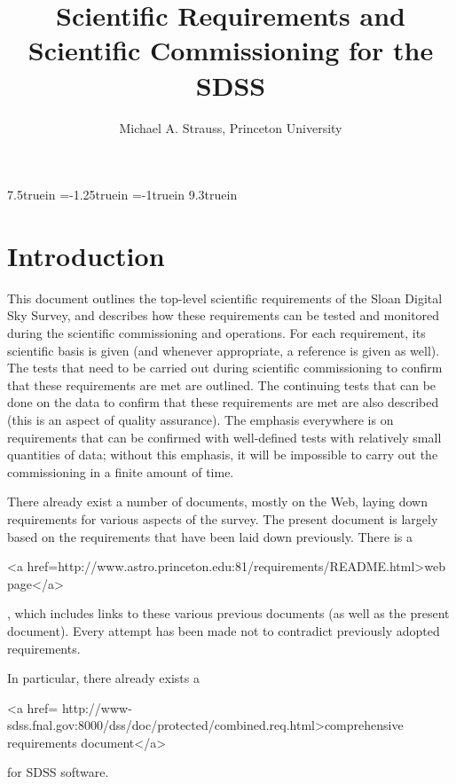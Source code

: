 \textwidth 7.5truein
\hoffset=-1.25truein
\voffset=-1truein
\textheight 9.3truein
\newcommand{\htmladdnormallink}[2]{
\begin{rawhtml}
<a href=#2>#1</a>
\end{rawhtml}
}
\setcounter{tocdepth}{1}

\title{Scientific Requirements and Scientific Commissioning for the SDSS}
\author{Michael A. Strauss, Princeton University}
\maketitle

\tableofcontents
\parskip 0pt
\section{Introduction}
This document outlines the top-level scientific requirements
of the Sloan Digital Sky Survey, and describes how these requirements
can be tested and monitored during the scientific commissioning and 
operations.  For each requirement, its scientific basis is
given (and whenever appropriate, a reference is given as well).  The
tests that need to be carried out during scientific commissioning to
confirm that these requirements are met are
outlined.  The continuing 
tests that can be done on the data to confirm that these
requirements are met are also described (this is an aspect of quality
assurance).  The emphasis everywhere is on requirements that can be
confirmed with well-defined tests with relatively small quantities of
data; without this emphasis, it will be impossible to carry out the
commissioning in a finite amount of time.  

There already exist a number of documents, mostly on the Web, laying
down requirements for various aspects of the survey.  The present
document is largely based on the requirements that have been laid down
previously.  There is a 
\begin{rawhtml}
<a href=http://www.astro.princeton.edu:81/requirements/README.html>web
page</a>\end{rawhtml},
which 
includes links to these various previous documents (as well as the
present document).  Every attempt has been made not to contradict
previously adopted requirements.

In particular, there already exists a 
\begin{rawhtml}
<a href=
http://www-sdss.fnal.gov:8000/dss/doc/protected/combined.req.html>comprehensive requirements
document</a>\end{rawhtml} for SDSS 
software.

